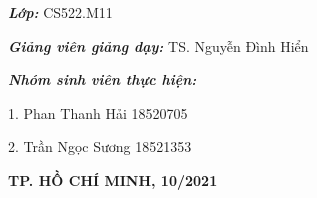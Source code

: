 \begin{titlepage}
	\vspace{1.5cm}
	\justifying \normalsize	
	\hspace{70pt} \textbf{\textit{Lớp:}} CS522.M11
		
	\hspace{70pt} \textbf{\textit{Giảng viên giảng dạy:}} TS. Nguyễn Đình Hiển
			
	\hspace{70pt} \textbf{\textit{Nhóm sinh viên thực hiện:}}
		
	\hspace{70pt} 1. \hspace{10pt} Phan Thanh Hải \hspace{98pt} 18520705
		
	\hspace{70pt} 2. \hspace{10pt} Trần Ngọc Sương \hspace{95pt} 18521353
			
	\vspace{2cm}
		
	\begin{center}
		\textbf{TP. HỒ CHÍ MINH, 10/2021}
    \end{center}

\end{titlepage}